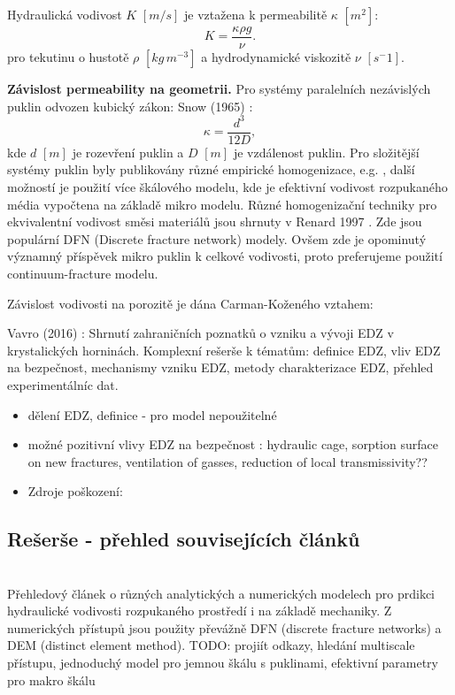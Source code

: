 \documentclass{article}
\begin{document}
Hydraulická vodivost $K$ $[m/s]$ je vztažena k permeabilitě $\kappa$ $[m^2]$:
\[
    K =\frac{\kappa \rho g}{\nu}.
\]
pro tekutinu o hustotě $\rho$ $[kg\, m^{-3}]$ a hydrodynamické viskozitě $\nu$ $[s^-1]$.

{\bf Závislost permeability na geometrii.} Pro systémy paralelních nezávislých puklin odvozen kubický zákon: Snow (1965) \cite{Snow1965}:
\[
    \kappa=\frac{d^3}{12 D},
\] 
kde $d$ $[m]$ je rozevření puklin a $D$ $[m]$ je vzdálenost puklin. Pro složitější systémy puklin byly publikovány různé empirické homogenizace, e.g. \cite{Pouya2011}, další možností je použití více škálového modelu, kde je efektivní vodivost rozpukaného média vypočtena na základě mikro modelu. 
Různé homogenizační techniky pro ekvivalentní vodivost směsi materiálů jsou shrnuty v Renard 1997 \cite{Renard1997}.
Zde jsou populární DFN (Discrete fracture network) modely. Ovšem zde je opominutý významný příspěvek mikro puklin k celkové vodivosti, proto preferujeme použití continuum-fracture modelu.


Závislost vodivosti na porozitě je dána Carman-Koženého vztahem:

Vavro (2016) \cite{SURAO_50/2016}: Shrnutí zahraničních poznatků o vzniku a vývoji EDZ v krystalických horninách. Komplexní rešerše k tématům: definice EDZ, vliv EDZ na bezpečnost, mechanismy vzniku EDZ, metody charakterizace EDZ, přehled experimentálníc dat.

\begin{itemize}
    \item dělení EDZ, definice - pro model nepoužitelné
    \item možné pozitivní vlivy EDZ na bezpečnost \cite{Lanyon2011}: hydraulic cage, sorption surface on new fractures, ventilation of gasses, reduction of local transmissivity??
    \item Zdroje poškození:
    
\end{itemize}




\subsection{Rešerše - přehled souvisejících článků}
{\bf \cite{Shahbazi2020a}}\\
Přehledový článek o různých analytických a numerických modelech 
pro prdikci hydraulické vodivosti rozpukaného prostředí i na základě mechaniky. Z numerických přístupů 
jsou použity převážně DFN (discrete fracture networks) a DEM (distinct element method). 
TODO: projiít odkazy, hledání multiscale přístupu, jednoduchý model pro jemnou škálu s puklinami, 
efektivní parametry pro makro škálu
\end{document}
